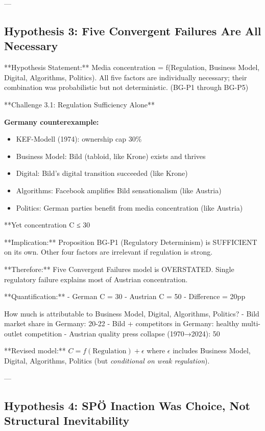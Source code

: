 ---

\subsection*{Hypothesis 3: Five Convergent Failures Are All Necessary}

**Hypothesis Statement:** Media concentration = f(Regulation, Business Model, Digital, Algorithms, Politics). All five factors are individually necessary; their combination was probabilistic but not deterministic. (BG-P1 through BG-P5)

**Challenge 3.1: Regulation Sufficiency Alone**

\textbf{Germany counterexample:}
\begin{itemize}
\item KEF-Modell (1974): ownership cap 30\%
\item Business Model: Bild (tabloid, like Krone) exists and thrives
\item Digital: Bild's digital transition succeeded (like Krone)
\item Algorithms: Facebook amplifies Bild sensationalism (like Austria)
\item Politics: German parties benefit from media concentration (like Austria)
\end{itemize}

**Yet concentration C ≤ 30%

**Implication:** Proposition BG-P1 (Regulatory Determinism) is SUFFICIENT on its own. Other four factors are irrelevant if regulation is strong.

**Therefore:** Five Convergent Failures model is OVERSTATED. Single regulatory failure explains most of Austrian concentration.

**Quantification:**
- German C = 30%
- Austrian C = 50%
- Difference = 20pp

How much is attributable to Business Model, Digital, Algorithms, Politics?
- Bild market share in Germany: 20-22%
- Bild + competitors in Germany: healthy multi-outlet competition
- Austrian quality press collapse (1970→2024): 50%

**Revised model:** $C = f(\text{Regulation}) + \epsilon$ where $\epsilon$ includes Business Model, Digital, Algorithms, Politics (but \textit{conditional on weak regulation}).

---

\subsection*{Hypothesis 4: SPÖ Inaction Was Choice, Not Structural Inevitability}

